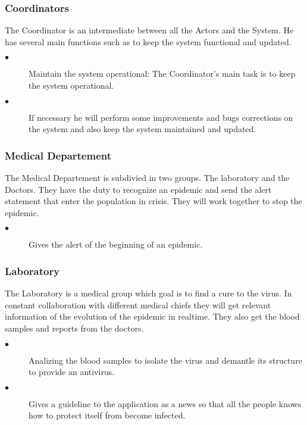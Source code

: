 \subsubsection{Coordinators}
The Coordinator is an intermediate between all the Actors and the System. He has
several main functions such as to keep the system functional and updated.\\
\begin{description}
 \item[$\bullet$] Maintain the system operational: The Coordinator's main task
 is to keep the system operational.
 \item[$\bullet$] If necessary he will perform some improvements and bugs
 corrections on the system and also keep the system maintained and updated.
\end{description} 

\subsubsection{Medical Departement}
The Medical Departement is subdivied in two groups. The laboratory and the
Doctors. They have the duty to recognize an epidemic and send the alert
statement that enter the population in crisis. They will work together to stop
the epidemic.\\
\begin{description}
 \item[$\bullet$] Gives the alert of the beginning of an epidemic.
 \end{description} 

\subsubsection{Laboratory}
The Laboratory is a medical group which goal is to find a cure to the virus. In
constant collaboration with different medical chiefs they will get relevant
information of the evolution of the epidemic in realtime. They also get the
blood samples and reports from the doctors.\\
\begin{description}
 \item[$\bullet$] Analizing the blood samples to isolate the virus and demantle
 its structure to provide an antivirus.
 \item[$\bullet$] Gives a guideline to the application as a news so that all the
 people knows how to protect itself from become infected.
 \end{description} 


